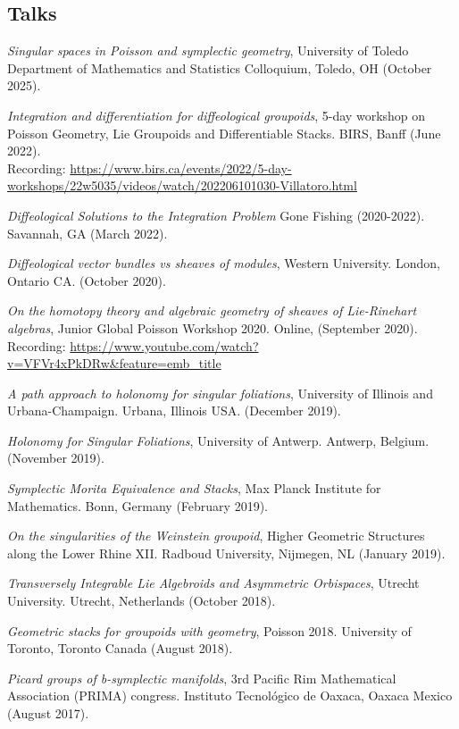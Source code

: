 \documentclass[margin,line,pifont,palatino,courier]{res}
\begin{document}
\begin{resume}
\section{\sc Talks}

\emph{Singular spaces in Poisson and symplectic geometry}, University of Toledo Department of Mathematics and Statistics Colloquium, Toledo, OH (October 2025).

\emph{Integration and differentiation for diffeological groupoids}, 5-day workshop on Poisson Geometry, Lie Groupoids and Differentiable Stacks. BIRS, Banff (June 2022).\\
Recording: \url{https://www.birs.ca/events/2022/5-day-workshops/22w5035/videos/watch/202206101030-Villatoro.html}

\emph{Diffeological Solutions to the Integration Problem} Gone Fishing (2020-2022). Savannah, GA (March 2022).

\emph{Diffeological vector bundles vs sheaves of modules}, Western University. London, Ontario CA. (October 2020).

\emph{On the homotopy theory and algebraic geometry of sheaves of Lie-Rinehart algebras}, Junior Global Poisson Workshop 2020. Online, (September 2020). \\
Recording: \url{https://www.youtube.com/watch?v=VFVr4xPkDRw&feature=emb_title}

\emph{A path approach to holonomy for singular foliations}, University of Illinois and Urbana-Champaign. Urbana, Illinois USA. (December 2019).

\emph{Holonomy for Singular Foliations}, University of Antwerp. Antwerp, Belgium. (November 2019).

\emph{Symplectic Morita Equivalence and Stacks}, Max Planck Institute for Mathematics. Bonn, Germany (February 2019).

\emph{On the singularities of the Weinstein groupoid}, Higher Geometric Structures along the Lower Rhine XII. Radboud University, Nijmegen, NL (January 2019).

\emph{Transversely Integrable Lie Algebroids and Asymmetric Orbispaces}, Utrecht University. Utrecht, Netherlands (October 2018).

\emph{Geometric stacks for groupoids with geometry}, Poisson 2018. University of Toronto, Toronto Canada (August 2018).

\emph{Picard groups of b-symplectic manifolds}, 3rd Pacific Rim Mathematical Association (PRIMA) congress. Instituto Tecnol\'ogico de Oaxaca, Oaxaca Mexico (August 2017).


\end{resume}
\end{document}
